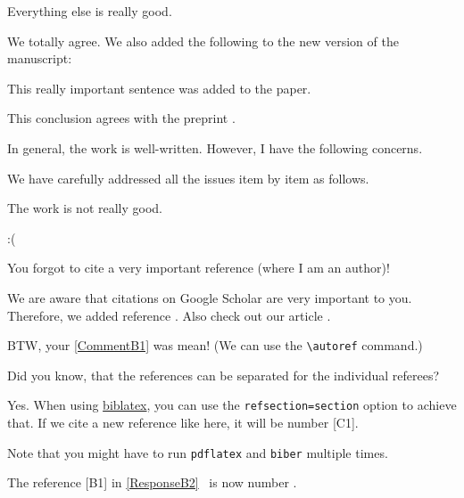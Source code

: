 \documentclass[12pt,english]{reviewresponse}
\begin{document}
\begin{revcomment}\label{CommentA2}
	Everything else is really good.
\end{revcomment}
\begin{revresponse}\label{ResponseA2}
	We totally agree. We also added the following to the new version of the manuscript:
	\begin{changes}
		This really important sentence was added to the paper.
	\end{changes}
	This conclusion agrees with the preprint \cite{Perelman2002Entropy}.
\end{revresponse}

\printbibliographyreferee

\label{RefereeB}

\begin{generalcomment}
	In general, the work is well-written. However, I have the following concerns.
\end{generalcomment}
\begin{generalresponse}
	We have carefully addressed all the issues item by item as follows.
\end{generalresponse}

\begin{revcomment}\label{CommentB1}
	The work is not really good.
\end{revcomment}
\begin{revresponse}
	:(
\end{revresponse}

\begin{revcomment}\label{CommentB2}
	You forgot to cite a very important reference (where I am an author)!
\end{revcomment}
\begin{revresponse}\label{ResponseB2}
	We are aware that citations on Google Scholar are very important to you.
	Therefore, we added reference \cite{RefereeReference}.
	Also check out our article \cite{Einstein1935Can}.

	BTW, your \autoref{CommentB1} was mean! (We can use the \verb|\autoref| command.)
\end{revresponse}

\printbibliographyreferee


\label{RefereeC}

\begin{revcomment}\label{CommentC1}
	Did you know, that the references can be separated for the individual referees?
\end{revcomment}
\begin{revresponse}
	Yes. When using \href{https://www.ctan.org/pkg/biblatex}{biblatex}, you can use the \texttt{refsection=section} option to achieve that.
	If we cite a new reference like \cite{Turing1936Computable} here, it will be number [C1].
	
	Note that you might have to run \texttt{pdflatex} and \texttt{biber} multiple times.
	
	The reference [B1] in \autoref{ResponseB2}~ is now number \cite{RefereeReference}.
\end{revresponse}

\printbibliographyreferee
\end{document}
